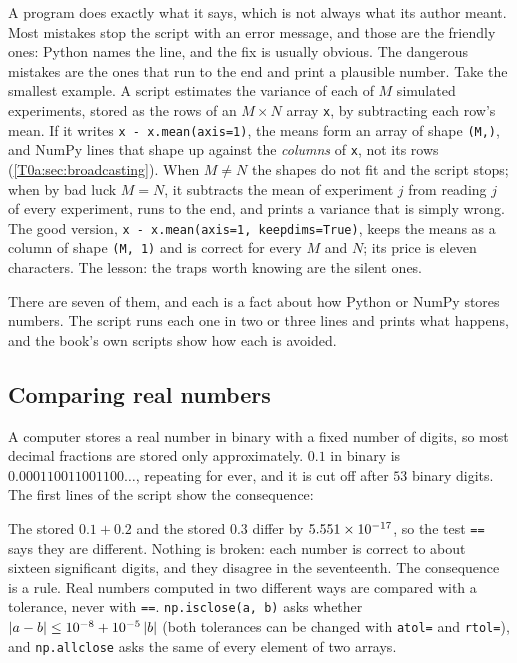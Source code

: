 A program does exactly what it says, which is not always what its author meant. Most mistakes stop the script with an error message, and those are the friendly ones: Python names the line, and the fix is usually obvious. The dangerous mistakes are the ones that run to the end and print a plausible number. Take the smallest example. A script estimates the variance of each of $M$ simulated experiments, stored as the rows of an $M\times N$ array \texttt{x}, by subtracting each row's mean. If it writes \texttt{x - x.mean(axis=1)}, the means form an array of shape \texttt{(M,)}, and NumPy lines that shape up against the \emph{columns} of \texttt{x}, not its rows (\cref{T0a:sec:broadcasting}). When $M\neq N$ the shapes do not fit and the script stops; when by bad luck $M=N$, it subtracts the mean of experiment $j$ from reading $j$ of every experiment, runs to the end, and prints a variance that is simply wrong. The good version, \texttt{x - x.mean(axis=1, keepdims=True)}, keeps the means as a column of shape \texttt{(M, 1)} and is correct for every $M$ and $N$; its price is eleven characters. The lesson: the traps worth knowing are the silent ones.

There are seven of them, and each is a fact about how Python or NumPy stores numbers. The script  runs each one in two or three lines and prints what happens, and the book's own scripts show how each is avoided.

\subsection{Comparing real numbers}
\label{T0a:sec:pit-float}

A computer stores a real number in binary with a fixed number of digits, so most decimal fractions are stored only approximately. $0.1$ in binary is $0.000110011001100\ldots$, repeating for ever, and it is cut off after $53$ binary digits. The first lines of the script show the consequence:


The stored $0.1+0.2$ and the stored $0.3$ differ by $5.551\times10^{-17}$, so the test \texttt{==} says they are different. Nothing is broken: each number is correct to about sixteen significant digits, and they disagree in the seventeenth. The consequence is a rule. Real numbers computed in two different ways are compared with a tolerance, never with \texttt{==}. \texttt{np.isclose(a, b)} asks whether $\left\lvert a-b\right\rvert\le 10^{-8}+10^{-5}\left\lvert b\right\rvert$ (both tolerances can be changed with \texttt{atol=} and \texttt{rtol=}), and \texttt{np.allclose} asks the same of every element of two arrays.

